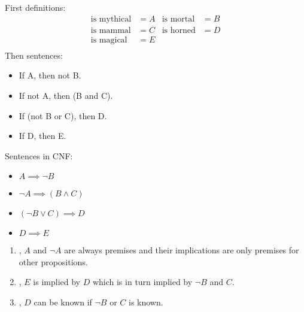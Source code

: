 \documentclass[]{homework}
\begin{document}
\question
\begin{alphaparts}
    \questionpart First definitions:
        \begin{align*}
            \text{is mythical}	&= 	A &\text{is mortal}	&= 	B \\
            \text{is mammal}	&= 	C &\text{is horned}	&= 	D \\
            \text{is magical}	&= 	E \\
        \end{align*}
        Then sentences:
        \begin{itemize}
            \item If A, then not B.
            \item If not A, then (B and C).
            \item If (not B or C), then D.
            \item If D, then E.
        \end{itemize}
    \questionpart Sentences in CNF:
        \begin{itemize}
            \item $A \implies \neg B$
            \item $\neg A \implies (B \land C)$
            \item $(\neg B \lor C) \implies D$
            \item $D \implies E$
        \end{itemize}
    \questionpart
        \begin{enumerate}
            \item {}, $A$ and $\neg A$ are always premises and their implications are only premises for other propositions.
            \item {}, $E$ is implied by $D$ which is in turn implied by $\neg B$ and $C$.
            \item {}, $D$ can be known if $\neg B$ or $C$ is known.
        \end{enumerate}
\end{alphaparts}
\end{document}
